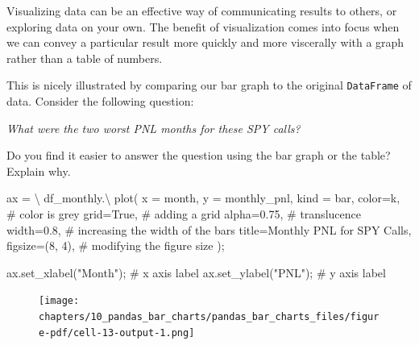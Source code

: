 \documentclass[
  letterpaper,
  DIV=11,
  numbers=noendperiod]{scrreprt}
\newenvironment{Shaded}{\begin{snugshade}}{\end{snugshade}}
\newcommand{\CommentTok}[1]{\textcolor[rgb]{0.37,0.37,0.37}{#1}}
\newcommand{\DecValTok}[1]{\textcolor[rgb]{0.68,0.00,0.00}{#1}}
\newcommand{\FloatTok}[1]{\textcolor[rgb]{0.68,0.00,0.00}{#1}}
\newcommand{\NormalTok}[1]{\textcolor[rgb]{0.00,0.23,0.31}{#1}}
\newcommand{\OperatorTok}[1]{\textcolor[rgb]{0.37,0.37,0.37}{#1}}
\newcommand{\StringTok}[1]{\textcolor[rgb]{0.13,0.47,0.30}{#1}}
\newcommand{\VariableTok}[1]{\textcolor[rgb]{0.07,0.07,0.07}{#1}}
\begin{document}
Visualizing data can be an effective way of communicating results to
others, or exploring data on your own. The benefit of visualization
comes into focus when we can convey a particular result more quickly and
more viscerally with a graph rather than a table of numbers.

This is nicely illustrated by comparing our bar graph to the original
\texttt{DataFrame} of data. Consider the following question:

\emph{What were the two worst PNL months for these SPY calls?}

Do you find it easier to answer the question using the bar graph or the
table? Explain why.

\begin{Shaded}
\begin{Highlighting}[]
\NormalTok{ax }\OperatorTok{=} \OperatorTok{\textbackslash{}}
\NormalTok{    df\_monthly.}\OperatorTok{\textbackslash{}}
\NormalTok{        plot(}
\NormalTok{            x }\OperatorTok{=} \StringTok{\textquotesingle{}month\textquotesingle{}}\NormalTok{,}
\NormalTok{            y }\OperatorTok{=} \StringTok{\textquotesingle{}monthly\_pnl\textquotesingle{}}\NormalTok{,}
\NormalTok{            kind }\OperatorTok{=} \StringTok{\textquotesingle{}bar\textquotesingle{}}\NormalTok{, }
\NormalTok{            color}\OperatorTok{=}\StringTok{\textquotesingle{}k\textquotesingle{}}\NormalTok{, }\CommentTok{\# color is grey}
\NormalTok{            grid}\OperatorTok{=}\VariableTok{True}\NormalTok{, }\CommentTok{\# adding a grid}
\NormalTok{            alpha}\OperatorTok{=}\FloatTok{0.75}\NormalTok{, }\CommentTok{\# translucence}
\NormalTok{            width}\OperatorTok{=}\FloatTok{0.8}\NormalTok{, }\CommentTok{\# increasing the width of the bars}
\NormalTok{            title}\OperatorTok{=}\StringTok{\textquotesingle{}Monthly PNL for SPY Calls\textquotesingle{}}\NormalTok{,}
\NormalTok{            figsize}\OperatorTok{=}\NormalTok{(}\DecValTok{8}\NormalTok{, }\DecValTok{4}\NormalTok{), }\CommentTok{\# modifying the figure size}
\NormalTok{        )}\OperatorTok{;}

\NormalTok{ax.set\_xlabel(}\StringTok{"Month"}\NormalTok{)}\OperatorTok{;} \CommentTok{\# x axis label}
\NormalTok{ax.set\_ylabel(}\StringTok{"PNL"}\NormalTok{)}\OperatorTok{;}   \CommentTok{\# y axis label}
\end{Highlighting}
\end{Shaded}

\begin{figure}[H]

{\centering \texttt{[image: chapters/10\_pandas\_bar\_charts/pandas\_bar\_charts\_files/figure-pdf/cell-13-output-1.png]}

}

\end{figure}
\end{document}
